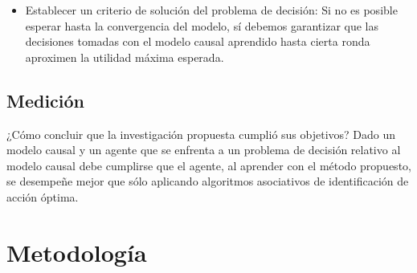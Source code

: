 \documentclass[11pt]{article}
\theoremstyle{plain}
\begin{document}
\begin{itemize}
\item Establecer un criterio de solución del problema de decisión: Si no es posible esperar hasta la convergencia del modelo, sí debemos garantizar que las decisiones tomadas con el modelo causal aprendido hasta cierta ronda aproximen la utilidad máxima esperada.

\end{itemize}
\subsection{Medición}
¿Cómo concluir que la investigación propuesta cumplió sus objetivos? Dado un modelo causal y un agente que se enfrenta a un problema de decisión relativo al modelo causal debe cumplirse que el agente, al aprender con el método propuesto, se desempeñe mejor que sólo aplicando algoritmos asociativos de identificación de acción óptima.
\section{Metodología}
\end{document}
